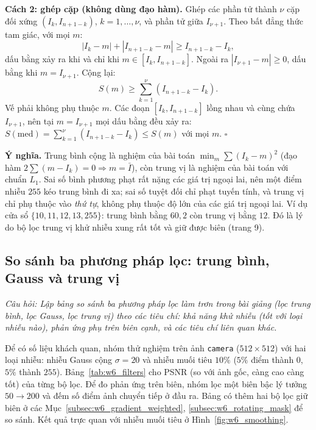 \textbf{Cách 2: ghép cặp (không dùng đạo hàm).} Ghép các phần tử thành $\nu$ cặp đối xứng $(I_k, I_{n + 1 - k})$, $k = 1, \ldots, \nu$, và phần tử giữa $I_{\nu + 1}$. Theo bất đẳng thức tam giác, với mọi $m$:
\begin{equation}
|I_k - m| + |I_{n + 1 - k} - m| \ge I_{n + 1 - k} - I_k,
\end{equation}
dấu bằng xảy ra khi và chỉ khi $m \in [I_k, I_{n + 1 - k}]$. Ngoài ra $|I_{\nu + 1} - m| \ge 0$, dấu bằng khi $m = I_{\nu + 1}$. Cộng lại:
\begin{equation}
S(m) \ge \sum_{k=1}^{\nu}(I_{n + 1 - k} - I_k).
\end{equation}
Vế phải không phụ thuộc $m$. Các đoạn $[I_k, I_{n + 1 - k}]$ lồng nhau và cùng chứa $I_{\nu + 1}$, nên tại $m = I_{\nu + 1}$ mọi dấu bằng đều xảy ra: $S(\mathrm{med}) = \sum_{k=1}^{\nu}(I_{n + 1 - k} - I_k) \le S(m)$ với mọi $m$. \hfill $\square$

\textbf{Ý nghĩa.} Trung bình cộng là nghiệm của bài toán $\min_m \sum (I_k - m)^2$ (đạo hàm $2\sum(m - I_k) = 0 \Rightarrow m = \bar I$), còn trung vị là nghiệm của bài toán với chuẩn $L_1$. Sai số bình phương phạt rất nặng các giá trị ngoại lai, nên một điểm nhiễu $255$ kéo trung bình đi xa; sai số tuyệt đối chỉ phạt tuyến tính, và trung vị chỉ phụ thuộc vào \emph{thứ tự}, không phụ thuộc độ lớn của các giá trị ngoại lai. Ví dụ cửa sổ $\{10, 11, 12, 13, 255\}$: trung bình bằng $60{,}2$ còn trung vị bằng $12$. Đó là lý do bộ lọc trung vị khử nhiễu xung rất tốt và giữ được biên (trang 9).

\subsection{So sánh ba phương pháp lọc: trung bình, Gauss và trung vị}
\label{subsec:w6_filter_compare}

\textit{Câu hỏi: Lập bảng so sánh ba phương pháp lọc làm trơn trong bài giảng (lọc trung bình, lọc Gauss, lọc trung vị) theo các tiêu chí: khả năng khử nhiễu (tốt với loại nhiễu nào), phản ứng phụ trên biên cạnh, và các tiêu chí liên quan khác.}

Để có số liệu khách quan, nhóm thử nghiệm trên ảnh \texttt{camera} ($512 \times 512$) với hai loại nhiễu: nhiễu Gauss cộng $\sigma = 20$ và nhiễu muối tiêu $10\%$ ($5\%$ điểm thành $0$, $5\%$ thành $255$). Bảng~\ref{tab:w6_filters} cho PSNR (so với ảnh gốc, càng cao càng tốt) của từng bộ lọc. Để đo phản ứng trên biên, nhóm lọc một biên bậc lý tưởng $50 \to 200$ và đếm số điểm ảnh chuyển tiếp ở đầu ra. Bảng có thêm hai bộ lọc giữ biên ở các Mục~\ref{subsec:w6_gradient_weighted}, \ref{subsec:w6_rotating_mask} để so sánh. Kết quả trực quan với nhiễu muối tiêu ở Hình~\ref{fig:w6_smoothing}.

